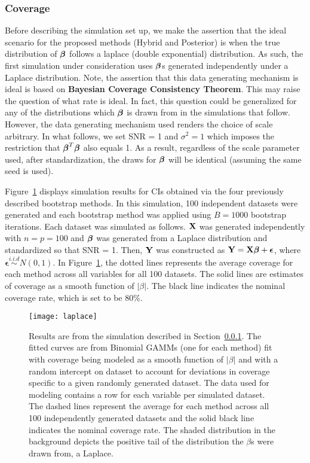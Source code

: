 \subsubsection{Coverage}\label{Sec:Coverage}

Before describing the simulation set up, we make the assertion that the ideal scenario for the proposed methods (Hybrid and Posterior) is when the true distribution of $\boldsymbol{\beta}$ follows a laplace (double exponential) distribution. As such, the first simulation under consideration uses $\boldsymbol{\beta}$s generated independently under a Laplace distribution. Note, the assertion that this data generating mechanism is ideal is based on \textbf{Bayesian Coverage Consistency Theorem}. This may raise the question of what rate is ideal. In fact, this question could be generalized for any of the distributions which $\boldsymbol{\beta}$ is drawn from in the simulations that follow. However, the data generating mechanism used renders the choice of scale arbitrary. In what follows, we set SNR = 1 and $\sigma^2 = 1$ which imposes the restriction that $\boldsymbol{\beta}^T\boldsymbol{\beta}$ also equals 1. As a result, regardless of the scale parameter used, after standardization, the draws for $\boldsymbol{\beta}$ will be identical (assuming the same seed is used).

Figure~\ref{Fig:laplace} displays simulation results for CIs obtained via the four previously described bootstrap methods. In this simulation, 100 independent datasets were generated and each bootstrap method was applied using $B = 1000$ bootstrap iterations. Each dataset was simulated as follows. $\mathbf{X}$ was generated independently with $n = p = 100$ and $\boldsymbol{\beta}$ was generated from a Laplace distribution and standardized so that SNR = 1. Then, $\mathbf{Y}$ was constructed as $\mathbf{Y} = \mathbf{X}\boldsymbol{\beta} + \boldsymbol{\epsilon}$, where $\boldsymbol{\epsilon} \overset{i.i.d}{\sim} N(0, 1)$. In Figure~\ref{Fig:laplace}, the dotted lines represents the average coverage for each method across all variables for all 100 datasets. The solid lines are estimates of coverage as a smooth function of $|\beta|$. The black line indicates the nominal coverage rate, which is set to be 80\%.

\begin{figure}[hbtp]
  \begin{center}
  \texttt{[image: laplace]}
  \caption{\label{Fig:laplace} Results are from the simulation described in Section~\ref{Sec:Coverage}. The fitted curves are from Binomial GAMMs (one for each method) fit with coverage being modeled as a smooth function of $|\beta|$ and with a random intercept on dataset to account for deviations in coverage specific to a given randomly generated dataset. The data used for modeling contains a row for each variable per simulated dataset. The dashed lines represent the average for each method across all 100 independently generated datasets and the solid black line indicates the nominal coverage rate. The shaded distribution in the background depicts the positive tail of the distribution the $\beta$s were drawn from, a Laplace.}
  \end{center}
\end{figure}

